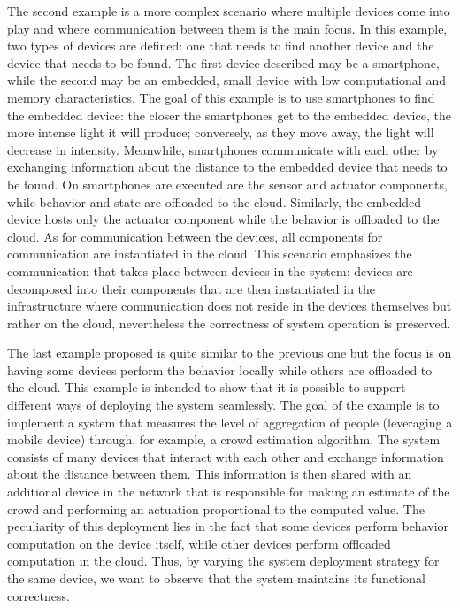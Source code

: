 The second example is a more complex scenario where multiple devices come into play and where communication between them is the main focus.
In this example, two types of devices are defined: one that needs to find another device and the device that needs to be found.
The first device described may be a smartphone, while the second may be an embedded, small device with low computational and memory characteristics.
The goal of this example is to use smartphones to find the embedded device: the closer the smartphones get to the embedded device, the more intense
light it will produce; conversely, as they move away, the light will decrease in intensity.
Meanwhile, smartphones communicate with each other by exchanging information about the distance to the embedded device that needs to be found.
On smartphones are executed are the sensor and actuator components, while behavior and state are offloaded to the cloud. Similarly, the embedded
device hosts only the actuator component while the behavior is offloaded to the cloud. As for communication between the devices, all components for
communication are instantiated in the cloud.
This scenario emphasizes the communication that takes place between devices in the system: devices are decomposed into their components that are then
instantiated in the infrastructure where communication does not reside in the devices themselves but rather on the cloud, nevertheless the
correctness of system operation is preserved.

The last example proposed is quite similar to the previous one but the focus is on having some devices perform the behavior locally while others are
offloaded to the cloud. This example is intended to show that it is possible to support different ways of deploying the system seamlessly.
The goal of the example is to implement a system that measures the level of aggregation of people (leveraging a mobile device) through, for example,
a crowd estimation algorithm.
The system consists of many devices that interact with each other and exchange information about the distance between them. This information is then
shared with an additional device in the network that is responsible for making an estimate of the crowd and performing an actuation proportional
to the computed value. The peculiarity of this deployment lies in the fact that some devices perform behavior computation on the device itself, while
other devices perform offloaded computation in the cloud. Thus, by varying the system deployment strategy for the same device, we want to observe
that the system maintains its functional correctness.
